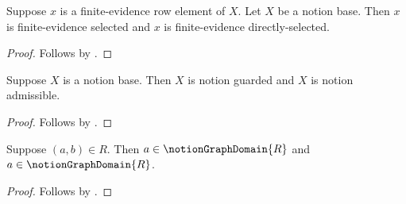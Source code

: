 


\begin{classification}\label{notion_bundle_anchored_results}
    Suppose $x$ is a finite-evidence row element of $X$.
    Let $X$ be a notion base.
    Then $x$ is finite-evidence selected and $x$ is finite-evidence directly-selected.
\end{classification}
\begin{proof}
    Follows by .
\end{proof}

\begin{classification}\label{notion_bundle_unary_results}
    Suppose $X$ is a notion base.
    Then $X$ is notion guarded and $X$ is notion admissible.
\end{classification}
\begin{proof}
    Follows by .
\end{proof}

\begin{classification}\label{notion_bundle_graph_results}
    Suppose $(a,b)\in R$.
    Then $a\in\notionGraphDomain{R}$ and $a\in\notionGraphDomain{R}$.
\end{classification}
\begin{proof}
    Follows by .
\end{proof}
